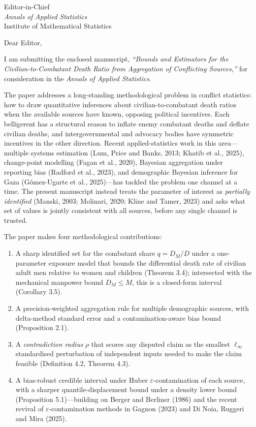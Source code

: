 \documentclass[11pt]{letter}
\begin{document}
\begin{letter}{Editor-in-Chief\\ \emph{Annals of Applied Statistics}\\ Institute of Mathematical Statistics}

\opening{Dear Editor,}

I am submitting the enclosed manuscript, \emph{``Bounds and Estimators for the Civilian-to-Combatant Death Ratio from Aggregation of Conflicting Sources,''} for consideration in the \emph{Annals of Applied Statistics}.

The paper addresses a long-standing methodological problem in conflict statistics: how to draw quantitative inferences about civilian-to-combatant death ratios when the available sources have known, opposing political incentives. Each belligerent has a structural reason to inflate enemy combatant deaths and deflate civilian deaths, and intergovernmental and advocacy bodies have symmetric incentives in the other direction. Recent applied-statistics work in this area---multiple systems estimation (Lum, Price and Banks, 2013; Khatib et al., 2025), change-point modelling (Fagan et al., 2020), Bayesian aggregation under reporting bias (Radford et al., 2023), and demographic Bayesian inference for Gaza (G\'{o}mez-Ugarte et al., 2025)---has tackled the problem one channel at a time. The present manuscript instead treats the parameter of interest as \emph{partially identified} (Manski, 2003; Molinari, 2020; Kline and Tamer, 2023) and asks what set of values is jointly consistent with all sources, before any single channel is trusted.

The paper makes four methodological contributions:
\begin{enumerate}
\item A sharp identified set for the combatant share $q=D_M/D$ under a one-parameter exposure model that bounds the differential death rate of civilian adult men relative to women and children (Theorem 3.4); intersected with the mechanical manpower bound $D_M\le M$, this is a closed-form interval (Corollary 3.5).
\item A precision-weighted aggregation rule for multiple demographic sources, with delta-method standard error and a contamination-aware bias bound (Proposition 2.1).
\item A \emph{contradiction radius} $\rho$ that scores any disputed claim as the smallest $\ell_\infty$ standardised perturbation of independent inputs needed to make the claim feasible (Definition 4.2, Theorem 4.3).
\item A bias-robust credible interval under Huber $\varepsilon$-contamination of each source, with a sharper quantile-displacement bound under a density lower bound (Proposition 5.1)---building on Berger and Berliner (1986) and the recent revival of $\varepsilon$-contamination methods in Gagnon (2023) and Di Noia, Ruggeri and Mira (2025).
\end{enumerate}


\end{letter}
\end{document}
